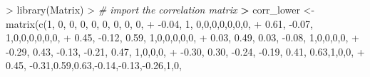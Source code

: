 \documentclass[
]{article}
\newenvironment{Shaded}{\begin{snugshade}}{\end{snugshade}}
\newcommand{\CommentTok}[1]{\textcolor[rgb]{0.56,0.35,0.01}{\textit{#1}}}
\newcommand{\DecValTok}[1]{\textcolor[rgb]{0.00,0.00,0.81}{#1}}
\newcommand{\ErrorTok}[1]{\textcolor[rgb]{0.64,0.00,0.00}{\textbf{#1}}}
\newcommand{\FloatTok}[1]{\textcolor[rgb]{0.00,0.00,0.81}{#1}}
\newcommand{\FunctionTok}[1]{\textcolor[rgb]{0.00,0.00,0.00}{#1}}
\newcommand{\NormalTok}[1]{#1}
\newcommand{\OtherTok}[1]{\textcolor[rgb]{0.56,0.35,0.01}{#1}}
\newcommand{\SpecialCharTok}[1]{\textcolor[rgb]{0.00,0.00,0.00}{#1}}
\begin{document}
\begin{Shaded}
\begin{Highlighting}[]
\SpecialCharTok{\textgreater{}} \FunctionTok{library}\NormalTok{(Matrix)}
\SpecialCharTok{\textgreater{}} \CommentTok{\# import the correlation matrix}
\ErrorTok{\textgreater{}}\NormalTok{ corr\_lower }\OtherTok{\textless{}{-}} \FunctionTok{matrix}\NormalTok{(}\FunctionTok{c}\NormalTok{(}\DecValTok{1}\NormalTok{, }\DecValTok{0}\NormalTok{, }\DecValTok{0}\NormalTok{, }\DecValTok{0}\NormalTok{, }\DecValTok{0}\NormalTok{, }\DecValTok{0}\NormalTok{, }\DecValTok{0}\NormalTok{, }\DecValTok{0}\NormalTok{, }\DecValTok{0}\NormalTok{,}
\SpecialCharTok{+}                       \SpecialCharTok{{-}}\FloatTok{0.04}\NormalTok{, }\DecValTok{1}\NormalTok{, }\DecValTok{0}\NormalTok{,}\DecValTok{0}\NormalTok{,}\DecValTok{0}\NormalTok{,}\DecValTok{0}\NormalTok{,}\DecValTok{0}\NormalTok{,}\DecValTok{0}\NormalTok{,}\DecValTok{0}\NormalTok{,}
\SpecialCharTok{+}                       \FloatTok{0.61}\NormalTok{, }\SpecialCharTok{{-}}\FloatTok{0.07}\NormalTok{, }\DecValTok{1}\NormalTok{,}\DecValTok{0}\NormalTok{,}\DecValTok{0}\NormalTok{,}\DecValTok{0}\NormalTok{,}\DecValTok{0}\NormalTok{,}\DecValTok{0}\NormalTok{,}\DecValTok{0}\NormalTok{,}
\SpecialCharTok{+}                       \FloatTok{0.45}\NormalTok{, }\SpecialCharTok{{-}}\FloatTok{0.12}\NormalTok{, }\FloatTok{0.59}\NormalTok{, }\DecValTok{1}\NormalTok{,}\DecValTok{0}\NormalTok{,}\DecValTok{0}\NormalTok{,}\DecValTok{0}\NormalTok{,}\DecValTok{0}\NormalTok{,}\DecValTok{0}\NormalTok{,}
\SpecialCharTok{+}                       \FloatTok{0.03}\NormalTok{, }\FloatTok{0.49}\NormalTok{, }\FloatTok{0.03}\NormalTok{, }\SpecialCharTok{{-}}\FloatTok{0.08}\NormalTok{, }\DecValTok{1}\NormalTok{,}\DecValTok{0}\NormalTok{,}\DecValTok{0}\NormalTok{,}\DecValTok{0}\NormalTok{,}\DecValTok{0}\NormalTok{,}
\SpecialCharTok{+}                       \SpecialCharTok{{-}}\FloatTok{0.29}\NormalTok{, }\FloatTok{0.43}\NormalTok{, }\SpecialCharTok{{-}}\FloatTok{0.13}\NormalTok{, }\SpecialCharTok{{-}}\FloatTok{0.21}\NormalTok{, }\FloatTok{0.47}\NormalTok{, }\DecValTok{1}\NormalTok{,}\DecValTok{0}\NormalTok{,}\DecValTok{0}\NormalTok{,}\DecValTok{0}\NormalTok{,}
\SpecialCharTok{+}                       \SpecialCharTok{{-}}\FloatTok{0.30}\NormalTok{, }\FloatTok{0.30}\NormalTok{, }\SpecialCharTok{{-}}\FloatTok{0.24}\NormalTok{, }\SpecialCharTok{{-}}\FloatTok{0.19}\NormalTok{, }\FloatTok{0.41}\NormalTok{, }\FloatTok{0.63}\NormalTok{,}\DecValTok{1}\NormalTok{,}\DecValTok{0}\NormalTok{,}\DecValTok{0}\NormalTok{, }
\SpecialCharTok{+}                       \FloatTok{0.45}\NormalTok{, }\SpecialCharTok{{-}}\FloatTok{0.31}\NormalTok{,}\FloatTok{0.59}\NormalTok{,}\FloatTok{0.63}\NormalTok{,}\SpecialCharTok{{-}}\FloatTok{0.14}\NormalTok{,}\SpecialCharTok{{-}}\FloatTok{0.13}\NormalTok{,}\SpecialCharTok{{-}}\FloatTok{0.26}\NormalTok{,}\DecValTok{1}\NormalTok{,}\DecValTok{0}\NormalTok{,}

\end{Highlighting}
\end{Shaded}
\end{document}
